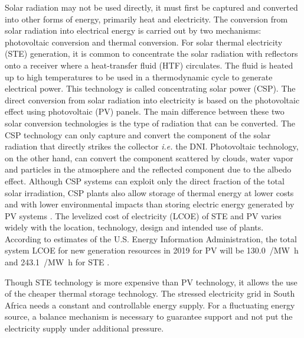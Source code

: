 Solar radiation may not be used directly, it must first be captured and converted into other forms of energy, primarily heat and electricity. The conversion from solar radiation into electrical energy is carried out by two mechanisms: photovoltaic conversion and thermal conversion. For solar thermal electricity (STE) generation, it is common to concentrate the solar radiation with reflectors onto a receiver where a heat-transfer fluid (HTF) circulates. The fluid is heated up to high temperatures to be used in a thermodynamic cycle to generate electrical power. This technology is called concentrating solar power (CSP). The direct conversion from solar radiation into electricity is based on the photovoltaic effect using photovoltaic (PV) panels. The main difference between these two solar conversion technologies is the type of radiation that can be converted. The CSP technology can only capture and convert the component of the solar radiation that directly strikes the collector \textit{i.e.} the DNI. Photovoltaic technology, on the other hand, can convert the component scattered by clouds, water vapor and particles in the atmosphere and the reflected component due to the albedo effect. Although CSP systems can exploit only the direct fraction of the total solar irradiation, CSP plants also allow storage of thermal energy at lower costs and with lower environmental impacts than storing electric energy generated by PV systems \cite{IEA2014e,EASAC2011}. The levelized cost of electricity (LCOE) of STE and PV varies widely with the location, technology, design and intended use of plants. According to estimates of the U.S. Energy Information Administration, the total system LCOE for new generation resources in 2019 for PV will be \SI{130.0}{\usd/\mega\watt\hour} and \SI{243.1}{\usd/\mega\watt\hour} for STE \cite{Outlook2014}. 


Though STE technology is more expensive than PV technology, it allows the use of the cheaper thermal storage technology. The stressed electricity grid in South Africa needs a constant and controllable energy supply. For a fluctuating energy source, a balance mechanism is necessary to guarantee support and not put the electricity supply under additional pressure.

